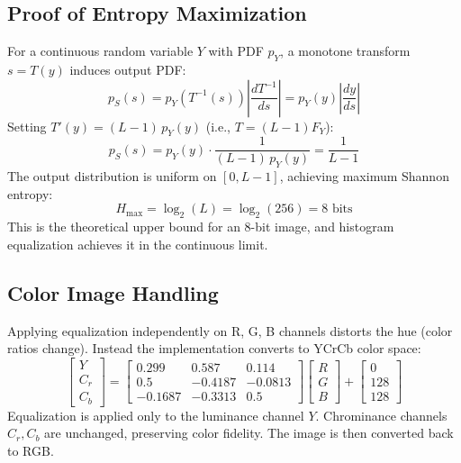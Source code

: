 \documentclass[10pt,conference]{IEEEtran}
\begin{document}
\subsection{Proof of Entropy Maximization}
For a continuous random variable $Y$ with PDF $p_Y$, a monotone transform $s = T(y)$ induces output PDF:
\begin{equation}
p_S(s) = p_Y(T^{-1}(s))\left|\frac{dT^{-1}}{ds}\right| = p_Y(y)\left|\frac{dy}{ds}\right|
\end{equation}
Setting $T'(y) = (L-1)\,p_Y(y)$ (i.e., $T = (L-1)F_Y$):
\begin{equation}
p_S(s) = p_Y(y) \cdot \frac{1}{(L-1)\,p_Y(y)} = \frac{1}{L-1}
\end{equation}
The output distribution is uniform on $[0, L-1]$, achieving maximum Shannon entropy:
\begin{equation}
H_{\max} = \log_2(L) = \log_2(256) = 8 \text{ bits}
\end{equation}
This is the theoretical upper bound for an 8-bit image, and histogram equalization achieves it in the continuous limit.

\subsection{Color Image Handling}
Applying equalization independently on R, G, B channels distorts the hue (color ratios change). Instead the implementation converts to YCrCb color space:
\begin{equation}
\begin{bmatrix}Y\\C_r\\C_b\end{bmatrix} = \begin{bmatrix}0.299&0.587&0.114\\0.5&-0.4187&-0.0813\\-0.1687&-0.3313&0.5\end{bmatrix}\begin{bmatrix}R\\G\\B\end{bmatrix} + \begin{bmatrix}0\\128\\128\end{bmatrix}
\end{equation}
Equalization is applied only to the luminance channel $Y$. Chrominance channels $C_r, C_b$ are unchanged, preserving color fidelity. The image is then converted back to RGB.
\end{document}
